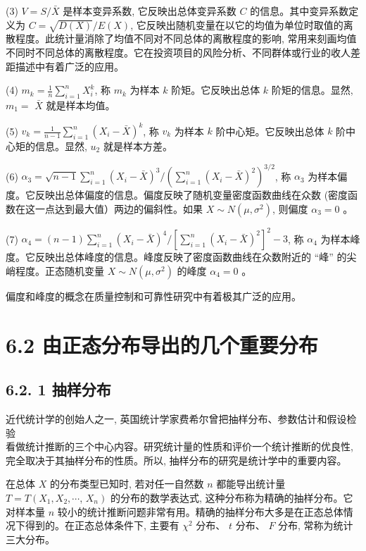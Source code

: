 \documentclass[10pt]{article}
\begin{document}
\begin{CJK*}{UTF8}{bsmi}
(3) $V=S / \bar{X}$ 是样本变异系数, 它反映出总体变异系数 $C$ 的信息。其中变异系数定义为 $C=\sqrt{D(X)} / E(X)$, 它反映出随机变量在以它的均值为单位时取值的离散程度。此统计量消除了均值不同对不同总体的离散程度的影响, 常用来刻画均值不同时不同总体的离散程度。它在投资项目的风险分析、不同群体或行业的收人差距描述中有着广泛的应用。

(4) $m_{k}=\frac{1}{n} \sum_{i=1}^{n} X_{i}^{k}$, 称 $m_{k}$ 为样本 $k$ 阶矩。它反映出总体 $k$ 阶矩的信息。显然, $m_{1}=$ $\bar{X}$ 就是样本均值。

(5) $v_{k}=\frac{1}{n-1} \sum_{i=1}^{n}\left(X_{i}-\bar{X}\right)^{k}$, 称 $v_{k}$ 为样本 $k$ 阶中心矩。它反映出总体 $k$ 阶中心矩的信息。显然, $u_{2}$ 就是样本方差。

(6) $\alpha_{3}=\sqrt{n-1} \sum_{i=1}^{n}\left(X_{i}-\bar{X}\right)^{3} /\left(\sum_{i=1}^{n}\left(X_{i}-\bar{X}\right)^{2}\right)^{3 / 2}$, 称 $\alpha_{3}$ 为样本偏度。它反映出总体偏度的信息。偏度反映了随机变量密度函数曲线在众数 (密度函数在这一点达到最大值）两边的偏斜性。如果 $X \sim N\left(\mu, \sigma^{2}\right)$, 则偏度 $\alpha_{3}=0$ 。

(7) $\alpha_{4}=(n-1) \sum_{i=1}^{n}\left(X_{i}-\bar{X}\right)^{4} /\left[\sum_{i=1}^{n}\left(X_{i}-\bar{X}\right)^{2}\right]^{2}-3$, 称 $\alpha_{4}$ 为样本峰度。它反映出总体峰度的信息。峰度反映了密度函数曲线在众数附近的 “峰” 的尖峭程度。正态随机变量 $X \sim N\left(\mu, \sigma^{2}\right)$ 的峰度 $\alpha_{4}=0$ 。

偏度和峰度的概念在质量控制和可靠性研究中有着极其广泛的应用。

\section*{6.2 由正态分布导出的几个重要分布}
\subsection*{6.2. 1 抽样分布}
近代统计学的创始人之一, 英国统计学家费希尔曾把抽样分布、参数估计和假设检验\\
看做统计推断的三个中心内容。研究统计量的性质和评价一个统计推断的优良性, 完全取决于其抽样分布的性质。所以, 抽样分布的研究是统计学中的重要内容。

在总体 $X$ 的分布类型已知时, 若对任一自然数 $n$ 都能导出统计量 $T=T\left(X_{1}, X_{2}, \cdots\right.$, $\left.X_{n}\right)$ 的分布的数学表达式, 这种分布称为精确的抽样分布。它对样本量 $n$ 较小的统计推断问题非常有用。精确的抽样分布大多是在正态总体情况下得到的。在正态总体条件下, 主要有 $\chi^{2}$ 分布、 $t$ 分布、 $F$ 分布, 常称为统计三大分布。


\end{CJK*}
\end{document}
